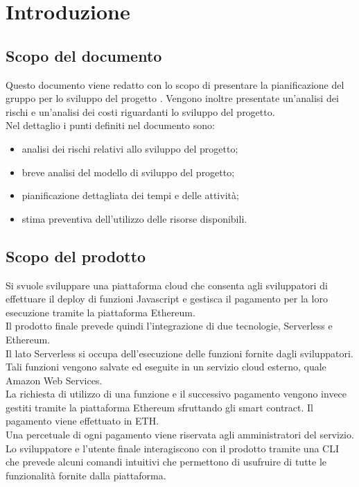 \section{Introduzione}
\subsection{Scopo del documento}
Questo documento viene redatto con lo scopo di presentare la pianificazione del gruppo \Gruppo{} per lo sviluppo del progetto \NomeProgetto{}. Vengono inoltre presentate un'analisi dei rischi e un'analisi dei costi riguardanti lo sviluppo del progetto.\\
Nel dettaglio i punti definiti nel documento sono:
\begin{itemize}
	\item analisi dei rischi relativi allo sviluppo del progetto;
	\item breve analisi del modello di sviluppo del progetto;
	\item pianificazione dettagliata dei tempi e delle attività;
	\item stima preventiva dell'utilizzo delle risorse disponibili.
\end{itemize}
\subsection{Scopo del prodotto}
Si svuole sviluppare una piattaforma cloud che consenta agli sviluppatori di effettuare il deploy di funzioni Javascript e gestisca il pagamento per la loro esecuzione tramite la piattaforma Ethereum.\\
Il prodotto finale prevede quindi l'integrazione di due tecnologie, Serverless e Ethereum.\\
Il lato Serverless si occupa dell'esecuzione delle funzioni fornite dagli sviluppatori. Tali funzioni vengono salvate ed eseguite in un servizio cloud esterno, quale Amazon Web Services.\\
La richiesta di utilizzo di una funzione e il successivo pagamento vengono invece gestiti tramite la piattaforma Ethereum sfruttando gli smart contract. Il pagamento viene effettuato in ETH.\\
Una percetuale di ogni pagamento viene riservata agli amministratori del servizio.\\
Lo sviluppatore e l'utente finale interagiscono con il prodotto tramite una CLI che prevede alcuni comandi intuitivi che permettono di usufruire di tutte le funzionalità fornite dalla piattaforma.
